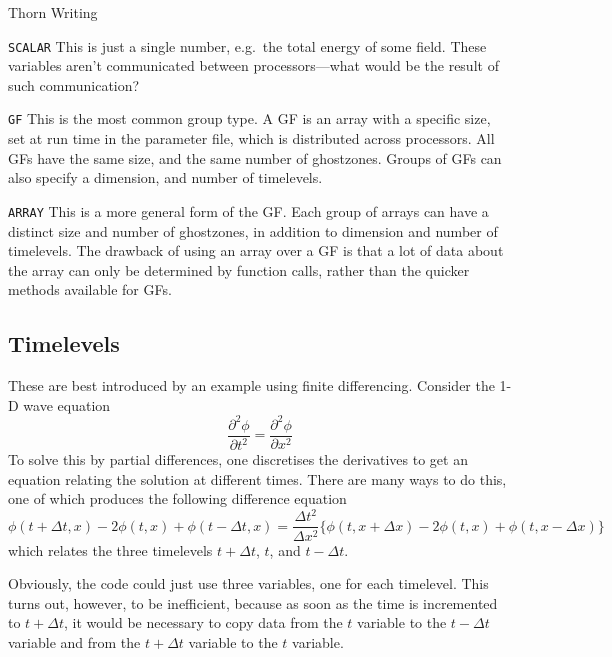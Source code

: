 \begin{cactuspart}{Thorn Writing}
\begin{Lentry}
\item[\texttt{SCALAR}]
This is just a single number, e.g.\ the total energy of some field.  These
variables aren't communicated between processors---what would be the
result of such communication?
\item[\texttt{GF}]
This is the most common group type.  A GF is an array with a
specific size, set at run time in the parameter file, which is distributed
across processors.  All GFs have the same size, and the same number of
ghostzones. Groups of GFs can also specify a dimension,
and number of timelevels.
\item[\texttt{ARRAY}]
This is a more general form of the GF.  Each group of arrays can have
a distinct size and number of ghostzones, in addition to dimension
and number of timelevels.
The drawback of using an array over a GF is that a lot of data about the
array can only be determined by function calls, rather than the
quicker methods available for GFs.
\end{Lentry}


\subsection{Timelevels}

These are best introduced by an example using finite differencing.
Consider the 1-D wave equation
\begin{equation}
\frac{\partial^2 \phi}{\partial t^2} = \frac{\partial^2 \phi}{\partial x^2}
\end{equation}
To solve this by partial differences, one discretises the derivatives to get
an equation relating the solution at different times.  There are many ways
to do this, one of which produces the following difference equation
\begin{equation}
\label{equation:difference}
\phi(t+\Delta t,x) -2\phi(t,x) +\phi(t-\Delta t,x) = \frac{\Delta t^2}{\Delta x^2} \lbrace{\phi(t,x+\Delta x) -2\phi(t,x) +\phi(t,x-\Delta x)}\rbrace
\end{equation}
which relates the three timelevels $t+\Delta t$, $t$, and $t-\Delta t$.

Obviously, the code could just use three variables, one for each timelevel.
This turns out, however, to be inefficient, because as soon as the time is
incremented to $t+\Delta t$, it would be necessary to copy data from the
$t$ variable to the $t-\Delta t$ variable and from the $t+\Delta t$ variable
to the $t$ variable.


\end{cactuspart}
